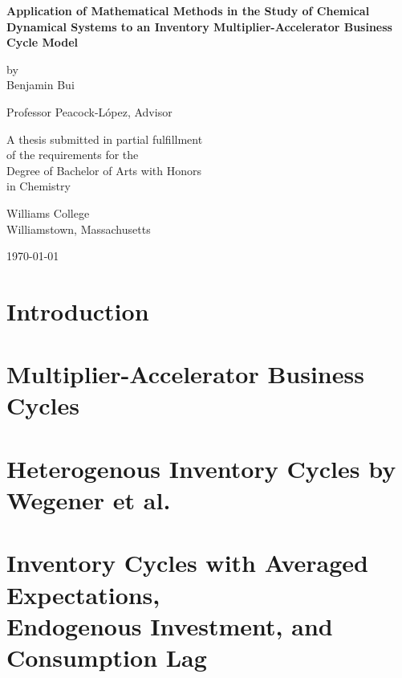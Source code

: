 \documentclass[12pt,twoside]{report}
\begin{document}
\begin{titlepage}
	\begin{center}
		\vspace*{1.5 cm}
		\textbf{Application of Mathematical Methods in the Study of Chemical Dynamical Systems to an Inventory Multiplier-Accelerator Business Cycle Model}


		\vspace{1.5 cm}

		by\\ Benjamin Bui
		\vspace{1.5 cm}

		Professor Peacock-L\'opez, Advisor
		\vspace{1.5 cm}

		A thesis submitted in partial fulfillment\\
		of the requirements for the\\
		Degree of Bachelor of Arts with Honors\\
		in Chemistry
		\vspace{1.5 cm}

		Williams College\\
		Williamstown, Massachusetts
		\vspace{1.5 cm}

		\today
	\end{center}
\end{titlepage}




\tableofcontents
\thispagestyle{plain}
\chapter{Introduction}

\chapter{Multiplier-Accelerator Business Cycles}\label{ch:multiplier-accelerator}

\chapter{Heterogenous Inventory Cycles by Wegener et al.}\label{ch:metzlerian_simple}

\chapter{Inventory Cycles with Averaged Expectations,\\ Endogenous Investment, and Consumption Lag}\label{ch:metzlerian-expanded}

\end{document}
